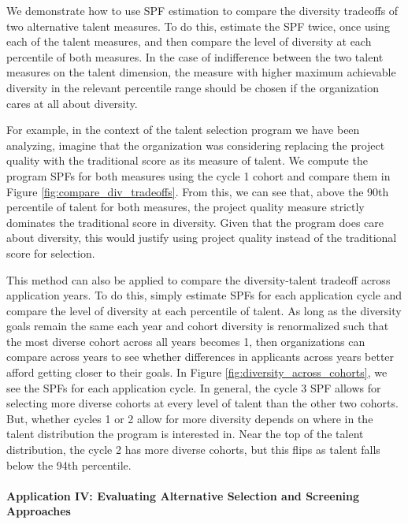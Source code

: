 We demonstrate how to use SPF estimation to compare the diversity tradeoffs of two alternative talent measures. To do this, estimate the SPF twice, once using each of the talent measures, and then compare the level of diversity at each percentile of both measures. In the case of indifference between the two talent measures on the talent dimension, the measure with higher maximum achievable diversity in the relevant percentile range should be chosen if the organization cares at all about diversity. 

For example, in the context of the talent selection program we have been analyzing, imagine that the organization was considering replacing the project quality with the traditional score as its measure of talent. We compute the program SPFs for both measures using the cycle 1 cohort and compare them in Figure \ref{fig:compare_div_tradeoffs}. From this, we can see that, above the 90th percentile of talent for both measures, the project quality measure strictly dominates the traditional score in diversity. Given that the program does care about diversity, this would justify using project quality instead of the traditional score for selection. 

This method can also be applied to compare the diversity-talent tradeoff across application years. To do this, simply estimate SPFs for each application cycle and compare the level of diversity at each percentile of talent. As long as the diversity goals remain the same each year and cohort diversity is renormalized such that the most diverse cohort across all years becomes 1, then organizations can compare across years to see whether differences in applicants across years better afford getting closer to their goals. In Figure \ref{fig:diversity_across_cohorts}, we see the SPFs for each application cycle. In general, the cycle 3 SPF allows for selecting more diverse cohorts at every level of talent than the other two cohorts. But, whether cycles 1 or 2 allow for more diversity depends on where in the talent distribution the program is interested in. Near the top of the talent distribution, the cycle 2 has more diverse cohorts, but this flips as talent falls below the 94th percentile. 

\paragraph{Application IV: Evaluating Alternative Selection and Screening Approaches} 


